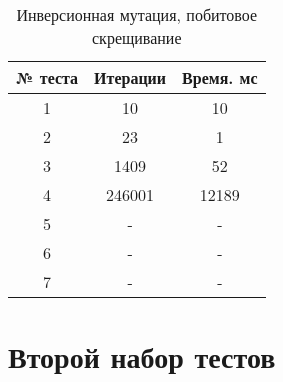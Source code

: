 \begin{table}[]
\centering
\caption{Инверсионная мутация, побитовое скрещивание}
\label{InvMutBitCross}
\begin{tabular}{|c|c|c|}
\hline
№ теста & Итерации & Время. мс \\ \hline
1       & 10       & 10        \\ \hline
2       & 23       & 1         \\ \hline
3       & 1409     & 52        \\ \hline
4       & 246001   & 12189     \\ \hline
5       & -        & -         \\ \hline
6       & -        & -         \\ \hline
7       & -        & -         \\ \hline
\end{tabular}
\end{table}

\section{Второй набор тестов}

